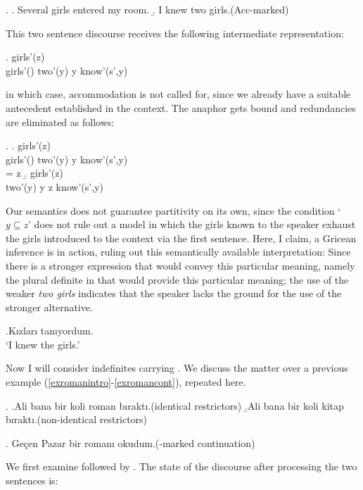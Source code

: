 \documentclass[11pt,a4paper]{article}
\begin{document}
\ex.
\a. Several girls entered my room.
\b. I knew two girls.\hfill (Acc-marked)


This two sentence discourse receives the following intermediate representation:

\ex.
{girls'(z)\\
girls'() \quad two'(y) \quad y \subseteq {} \quad know'(s',y)
}

in which case, accommodation is not called for, since we already have
a suitable antecedent established in the context. The anaphor gets
bound and redundancies are eliminated as follows: 

\ex. 
\a.
{girls'(z)\\
girls'() \quad two'(y) \quad y \subseteq {} \quad know'(s',y)\\
 = z
}
\b.
{girls'(z)\\
 two'(y) \quad y \subseteq z \quad know'(s',y)
}


Our semantics does not guarantee partitivity on its own, since the
condition `$y \subseteq z$' does not rule out a model in which the
girls known to the speaker exhaust the girls introduced to the context
via the first sentence. Here, I claim, a Gricean inference is in
action, ruling out this semantically available interpretation: Since
there is a stronger expression that would convey this particular
meaning, namely the plural definite in  that would
provide this particular meaning; the use of the weaker \emph{two
girls} indicates that the speaker lacks the ground for the use of the
stronger alternative.

\ex.\label{expludef}Kızları tanıyordum.\\
`I knew the girls.'


Now I will consider indefinites carrying . We
discuss the matter over a previous example
(\ref{exromanintro}-\ref{exromancont}), repeated here.

\ex.\label{exromanintrorep}
\a.\label{exromaniromrep}Ali bana bir koli roman bıraktı.\hfill{(identical restrictors)}
\b.\label{exromanikitrep}Ali bana bir koli kitap bıraktı.\hfill{(non-identical restrictors)}

\ex.\label{exromancontrep}
Geçen Pazar bir romanı okudum.\hfill{(\acc-marked continuation)}

We first examine  followed by
. The state of the discourse after processing
the two sentences is:
\end{document}
